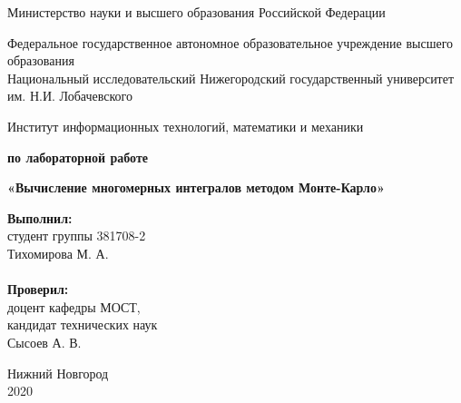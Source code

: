 \documentclass{report}
\begin{document}
\begin{titlepage}

\begin{center}
Министерство науки и высшего образования Российской Федерации
\end{center}

\begin{center}
Федеральное государственное автономное образовательное учреждение высшего образования \\
Национальный исследовательский Нижегородский государственный университет им. Н.И. Лобачевского
\end{center}

\begin{center}
Институт информационных технологий, математики и механики
\end{center}

\vspace{4em}

\begin{center}
\textbf{ по лабораторной работе} \\
\end{center}
\begin{center}
\textbf{\Large«Вычисление многомерных интегралов методом Монте-Карло»} \\
\end{center}

\vspace{4em}

\newbox{\lbox}
\newlength{\maxl}
\setlength{\maxl}{\wd\lbox}
\hfill\parbox{7cm}{
\hspace*{5cm}\hspace*{-5cm}\textbf{Выполнил:} \\ студент группы 381708-2 \\ Тихомирова М. А.\\
\\
\hspace*{5cm}\hspace*{-5cm}\textbf{Проверил:}\\ доцент кафедры МОСТ, \\ кандидат технических наук \\ Сысоев А. В.
}

\vspace{\fill}

\begin{center} Нижний Новгород \\ 2020 \end{center}

\end{titlepage}
\end{document}
